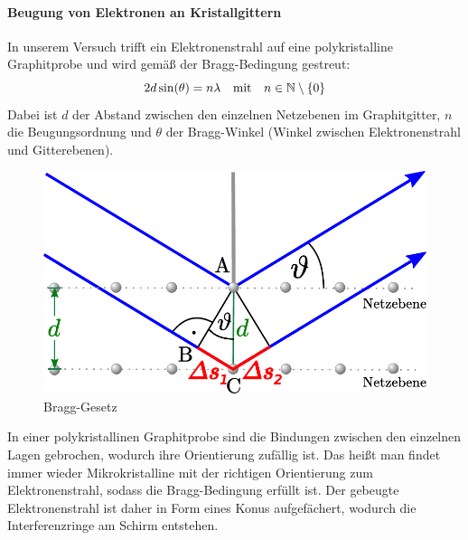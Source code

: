 \documentclass[ngerman]{scrartcl}
\begin{document}
\paragraph{Beugung von Elektronen an Kristallgittern}
%
In unserem Versuch trifft ein Elektronenstrahl auf eine polykristalline Graphitprobe und wird gemäß der Bragg-Bedingung gestreut:
%
\begin{equation}
    \label{eq:bragg}
    2 d \sin(\theta) = n \lambda \qq{mit} n \in \mathbb{N}\setminus\{0\}
\end{equation}
%
Dabei ist $d$ der Abstand zwischen den einzelnen Netzebenen im Graphitgitter, $n$ die Beugungsordnung und $\theta$ der Bragg-Winkel (Winkel zwischen Elektronenstrahl und Gitterebenen).
%
\begin{figure}[H]
    \centering
    \begin{samepage}
        \includegraphics[width=0.4\linewidth]{fig/bragg-reflexion.pdf}
        \caption{Bragg-Gesetz}
        \label{fig:bragg_reflexion}
    \end{samepage}
\end{figure}
%
In einer polykristallinen Graphitprobe sind die Bindungen zwischen den einzelnen Lagen gebrochen, wodurch ihre Orientierung zufällig ist. Das heißt man findet immer wieder Mikrokristalline mit der richtigen Orientierung zum Elektronenstrahl, sodass die Bragg-Bedingung erfüllt ist. Der gebeugte Elektronenstrahl ist daher in Form eines Konus aufgefächert, wodurch die Interferenzringe am Schirm entstehen.
%
\end{document}
